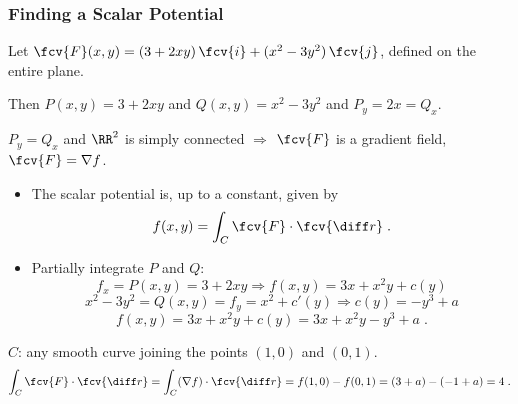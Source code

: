 \begin{frame}
\small
  \frametitle{Finding a Scalar Potential}

  Let $\fcv{F}(x,y) = (3+2xy) \, \fcv{i} + (x^2-3y^2)\, \fcv{j}$, defined on the entire plane. \pause

  Then $P(x,y) = 3+2xy$ and $Q(x,y) = x^2-3y^2$ and $P_y = 2x=Q_x$.

  \pause $P_y=Q_x$ and $\RR^2$ is simply connected $\Longrightarrow$ $\fcv{F}$ is a gradient field, $\fcv{F} = \nabla f$.

  \begin{itemize}
    \item \pause The scalar potential is, up to a constant, given by
%
$$f(x,y) = \int_C \fcv{F} \cdot \fcv{\diff r} \; .$$
%
    \item \pause Partially integrate $P$ and $Q$:
    $$f_x = P(x,y) = 3+2xy \Longrightarrow f(x,y) = 3x+x^2y + c(y)$$
    \pause
    $$x^2-3y^2  = Q(x,y) = f_y = x^2+c'(y) \Longrightarrow c(y) = -y^3+a$$
    \pause
    $$f(x,y) = 3x+x^2y + c(y) = 3x+x^2y-y^3+a\; .$$
  \end{itemize}

\pause $C$: any smooth curve joining the points $(1,0)$ and $(0,1)$.
%
$$\int_C \fcv{F} \cdot \fcv{\diff r} = \int_C (\nabla f) \cdot \fcv{\diff r} = f(1,0) - f(0,1) = (3+a) - (-1+a) = 4\; .$$

\end{frame}